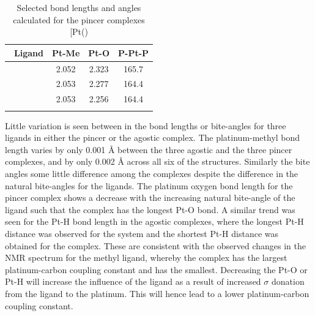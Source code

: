 \begin{table}[htp]
\caption[Selected bond lengths and angles calculated for [Pt(\tBuxantphosk)\ce{Me{]}+}]{Selected bond lengths and angles calculated for the pincer complexes [Pt(\tBuxantphosk)\ce{Me]+}}
\vspace{1em}
\label{table:PtMepincer}
\small
\begin{center}
\begin{tabular}{l c c c}
	\toprule
	~\bfseries{Ligand} & Pt-Me & Pt-O & P-Pt-P \\
	\midrule		
	~\tBuSixantphos	& 2.052	& 2.323 	& 165.7 \\
	~\tBuThixantphos	& 2.053	& 2.277	& 164.4 \\
	~\tBuXantphos{}	& 2.053	& 2.256	& 164.4 \\ 
	\bottomrule{}
\end{tabular}
\end{center}
\end{table}

Little variation is seen between in the bond lengths or bite-angles for three ligands in either the pincer or the agostic complex.  The platinum-methyl bond length varies by only 0.001 \si{\angstrom} between the three agostic and the three pincer complexes, and by only 0.002 \si{\angstrom} across all six of the structures.  Similarly the bite angles some little difference among the complexes despite the difference in the natural bite-angles for the ligands.  The platinum oxygen bond length for the pincer complex shows a decrease with the increasing natural bite-angle of the ligand such that the \tBusixantphos{} complex has the longest Pt-O bond.  A similar trend was seen for the Pt-H bond length in the agostic complexes, where the longest Pt-H distance was observed for the \tBusixantphos{} system and the shortest Pt-H distance was obtained for the \tBuxantphos{} complex.  These are consistent with the observed changes in the \carbon{} NMR spectrum for the methyl ligand, whereby the \tBusixantphos{} complex has the largest platinum-carbon coupling constant and \tBuxantphos{} has the smallest.  Decreasing the Pt-O or Pt-H will increase the \trans{} influence of the ligand as a result of increased $\sigma$ donation from the ligand to the platinum.  This will hence lead to a lower platinum-carbon coupling constant.  

